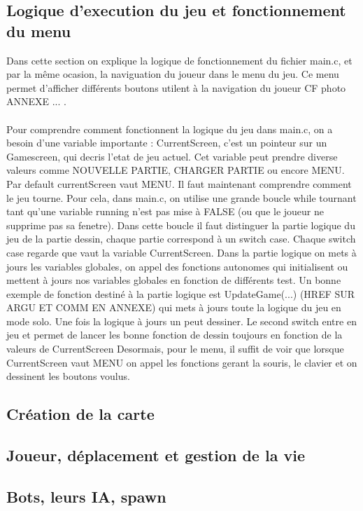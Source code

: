 \documentclass[a4paper,11pt]{article}
\begin{document}
\subsection{Logique d'execution du  jeu et fonctionnement du menu}
\indent Dans cette section on explique la logique de fonctionnement du fichier main.c, et par la même ocasion, la naviguation du joueur dans le menu du jeu.
Ce menu permet d'afficher différents boutons utilent à la navigation du joueur CF photo ANNEXE ... .
\\
\\
Pour comprendre comment fonctionnent la logique du jeu dans main.c, on a besoin d'une variable importante : CurrentScreen, c'est un pointeur sur un Gamescreen, qui decris l'etat de jeu actuel. 
Cet variable peut prendre diverse valeurs comme NOUVELLE PARTIE, CHARGER PARTIE ou encore MENU. Par default currentScreen vaut MENU. 
Il faut maintenant comprendre comment le jeu tourne. Pour cela, dans main.c, on utilise une grande boucle while tournant tant qu'une variable running n'est pas mise à FALSE (ou que le joueur ne supprime pas sa fenetre).
Dans cette boucle il faut distinguer la partie logique du jeu de la partie dessin, chaque partie correspond à un switch case. Chaque switch case regarde que vaut la variable CurrentScreen. Dans la partie logique on mets à jours les variables globales, on appel des fonctions autonomes qui initialisent ou mettent à jours nos variables globales en fonction de différents test.
Un bonne exemple de fonction destiné à la partie logique est UpdateGame(...) (HREF SUR ARGU ET COMM EN ANNEXE)  qui mets à jours toute la logique du jeu en mode solo. 
Une fois la logique à jours un peut dessiner. Le second switch entre en jeu et permet de lancer les bonne fonction de dessin toujours en fonction de la valeurs de CurrentScreen
Desormais, pour le menu, il suffit de voir que lorsque CurrentScreen vaut MENU on appel les fonctions gerant la souris, le clavier et on dessinent les boutons voulus.
\subsection{Création de la carte}
\subsection{Joueur, déplacement et gestion de la vie}
\subsection{Bots, leurs IA, spawn}
\end{document}
